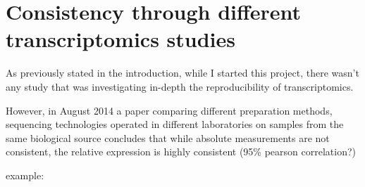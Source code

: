 \chapter{Consistency through different transcriptomics studies}
\label{sec:Transcriptomics}

As previously stated in the introduction, while I started this project,
there wasn't any study that was investigating in-depth the reproducibility of
transcriptomics.

\begin{comment}
Should the following go to the intro?
\end{comment}

However, in August 2014 a paper comparing different preparation methods,
sequencing technologies operated in different laboratories
on samples from the same biological source concludes that while absolute
measurements are not consistent, the relative expression is highly consistent
(95\% pearson correlation?)


example: \cite{schwanhausserglobal:2011}


